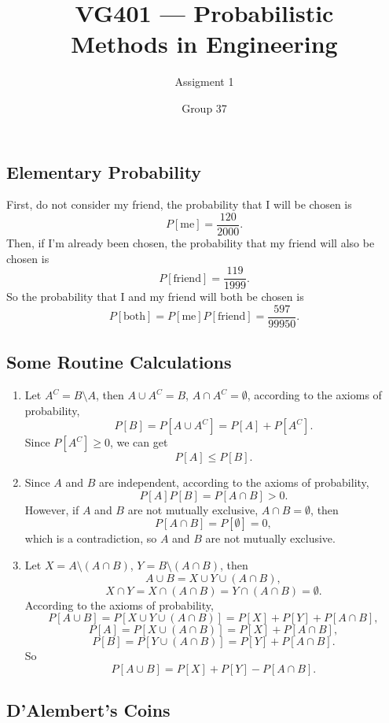 \documentclass[11pt,a4paper]{article}
\title{VG401 --- Probabilistic \\ Methods in Engineering}
\subtitle{Assigment 1}
\author{Group 37}
\begin{document}
\maketitle

\subsection{Elementary Probability}

First, do not consider my friend, the probability that I will be chosen is
$$P[\textrm{me}]=\frac{120}{2000}.$$
Then, if I'm already been chosen, the probability that my friend will also be chosen is
$$P[\textrm{friend}]=\frac{119}{1999}.$$
So the probability that I and my friend will both be chosen is
$$P[\textrm{both}]=P[\textrm{me}]P[\textrm{friend}]=\frac{597}{99950}.$$

\subsection{Some Routine Calculations}

\begin{enumerate}[label=\roman*)]
\item
Let $A^C=B\setminus A$, then $A\cup A^C=B$, $A\cap A^C=\emptyset$, according to the axioms of probability,
$$P[B]=P[A\cup A^C]=P[A]+P[A^C].$$
Since $P[A^C]\geqslant 0$, we can get
$$P[A]\leqslant P[B].$$
\item 
Since $A$ and $B$ are independent, according to the axioms of probability,
$$P[A]P[B]=P[A\cap B]>0.$$
However, if $A$ and $B$ are not mutually exclusive,
$A\cap B=\emptyset$, then
$$P[A\cap B]=P[\emptyset]=0,$$
which is a contradiction, so $A$ and $B$ are not mutually exclusive. \bigskip
\item 
Let $X=A\setminus(A\cap B)$, $Y=B\setminus(A\cap B)$, then 
$$A\cup B=X\cup Y\cup (A\cap B),$$
$$X\cap Y=X\cap(A\cap B)=Y\cap(A\cap B)=\emptyset.$$
According to the axioms of probability,
$$P[A\cup B]=P[X\cup Y\cup (A\cap B)]=P[X]+P[Y]+P[A\cap B],$$
$$P[A]=P[X\cup(A\cap B)]=P[X]+P[A\cap B],$$
$$P[B]=P[Y\cup(A\cap B)]=P[Y]+P[A\cap B].$$
So $$P[A\cup B]=P[X]+P[Y]-P[A\cap B].$$
\end{enumerate}

\subsection{D'Alembert's Coins}
\end{document}
